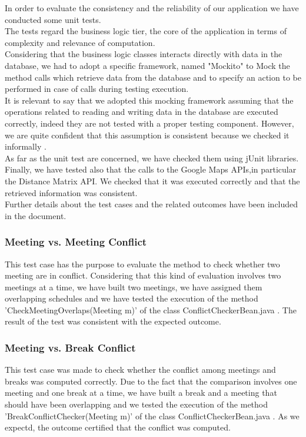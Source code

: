 In order to evaluate the consistency and the reliability of our application we have conducted some unit tests. \\
The tests regard the business logic tier, the core of the application in terms of complexity and relevance of computation.\\
Considering that the business logic classes interacts directly with data in the database, we had to adopt a specific framework, named "Mockito" to Mock the method calls which retrieve data from the database and to specify an action to be performed in case of calls during testing execution.\\
It is relevant to say that we adopted this mocking framework assuming that the operations related to reading and writing data in the database are executed correctly, indeed they are not tested with a proper testing component. However, we are quite confident that this assumption is consistent because we checked it informally .\\
As far as the unit test are concerned, we have checked them using jUnit libraries.\\
Finally, we have tested also that the calls to the Google Maps APIs,in particular the Distance Matrix API. We checked that it was executed correctly and that the  retrieved information was consistent.\\ 
Further details about the test cases and the related outcomes have been included in the document.\\


\subsubsection{Meeting vs. Meeting Conflict}
This test case has the purpose to evaluate the method to check whether two meeting are in conflict. Considering that this kind of evaluation involves two meetings at a time, we have  built two meetings, we have assigned them overlapping schedules and we have tested the execution of the method 'CheckMeetingOverlaps(Meeting m)' of the class ConflictCheckerBean.java . The result of the test was consistent with the expected outcome. 

\subsubsection{Meeting vs. Break Conflict}
This test case was made to check whether the conflict among meetings and breaks was computed correctly. Due to the fact that the comparison involves one meeting and one break at a time, we have built a break and a meeting that should have been overlapping and we tested the execution of the method 'BreakConflictChecker(Meeting m)' of the class ConflictCheckerBean.java . As we expectd, the outcome certified that the conflict was computed. 

